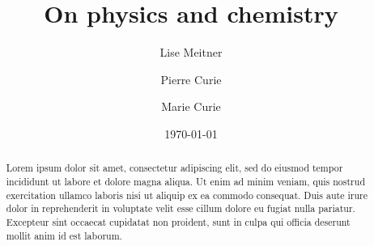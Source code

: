 \documentclass[aps,reprint,groupedaddress]{revtex4-1}
\begin{document}
\title{On physics and chemistry}\author{Lise Meitner}

 \author{Pierre Curie}
 \author{Marie Curie}
 
 \date{\today} 

\begin{abstract}
Lorem ipsum dolor sit amet, consectetur adipiscing elit, sed do eiusmod
tempor incididunt ut labore et dolore magna aliqua. Ut enim ad minim
veniam, quis nostrud exercitation ullamco laboris nisi ut aliquip ex ea
commodo consequat. Duis aute irure dolor in reprehenderit in voluptate
velit esse cillum dolore eu fugiat nulla pariatur. Excepteur sint
occaecat cupidatat non proident, sunt in culpa qui officia deserunt
mollit anim id est laborum.
\end{abstract}

\maketitle

\lipsum[2-6]
\end{document}
